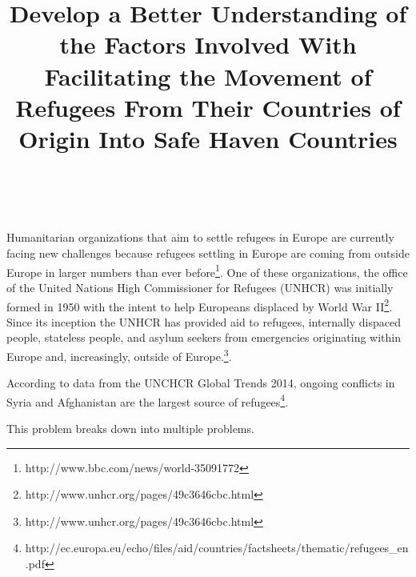 \documentclass{article}
\title{Develop a Better Understanding of the Factors Involved With Facilitating the Movement of Refugees From Their Countries of Origin Into Safe Haven Countries}
\author{\ \ }
\begin{document}
\maketitle

Humanitarian organizations that aim to settle refugees in Europe are currently facing new challenges because refugees settling in Europe are coming from outside Europe in larger numbers than ever before\footnote{http://www.bbc.com/news/world-35091772}. One of these organizations, the office of the United Nations High Commissioner for Refugees (UNHCR) was initially formed in 1950 with the intent to help Europeans displaced by World War II\footnote{http://www.unhcr.org/pages/49c3646cbc.html}. Since its inception the UNHCR has provided aid to refugees, internally dispaced people, stateless people, and asylum seekers from emergencies originating within Europe and, increasingly, outside of Europe.\footnote{http://www.unhcr.org/pages/49c3646cbc.html}.

According to data from the UNCHCR Global Trends 2014, ongoing conflicts in Syria and Afghanistan are the largest source of refugees\footnote{http://ec.europa.eu/echo/files/aid/countries/factsheets/thematic/refugees_en.pdf}. 

This problem breaks down into multiple problems.
\end{document}
